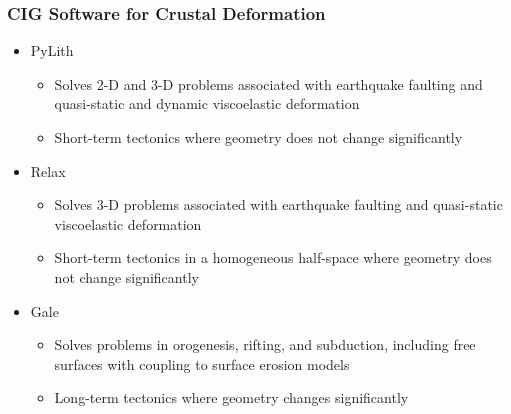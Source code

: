 \documentclass{beamer}
\begin{document}
\begin{frame}
  \frametitle{CIG Software for Crustal Deformation}
  \summary{}

  \begin{itemize}
  \item PyLith
    \begin{itemize}
    \item Solves 2-D and 3-D problems associated with earthquake
      faulting and quasi-static and dynamic viscoelastic deformation
    \item Short-term tectonics where geometry does not change
      significantly
    \end{itemize}
  \item Relax
    \begin{itemize}
    \item Solves 3-D problems associated with earthquake faulting and
      quasi-static viscoelastic deformation
    \item Short-term tectonics in a homogeneous half-space where
      geometry does not change significantly
    \end{itemize}
  \item Gale
    \begin{itemize}
    \item Solves problems in orogenesis, rifting, and subduction,
      including free surfaces with coupling to surface erosion models
    \item Long-term tectonics where geometry changes significantly
    \end{itemize}
  \end{itemize}
 
\end{frame}

 
\end{document}
